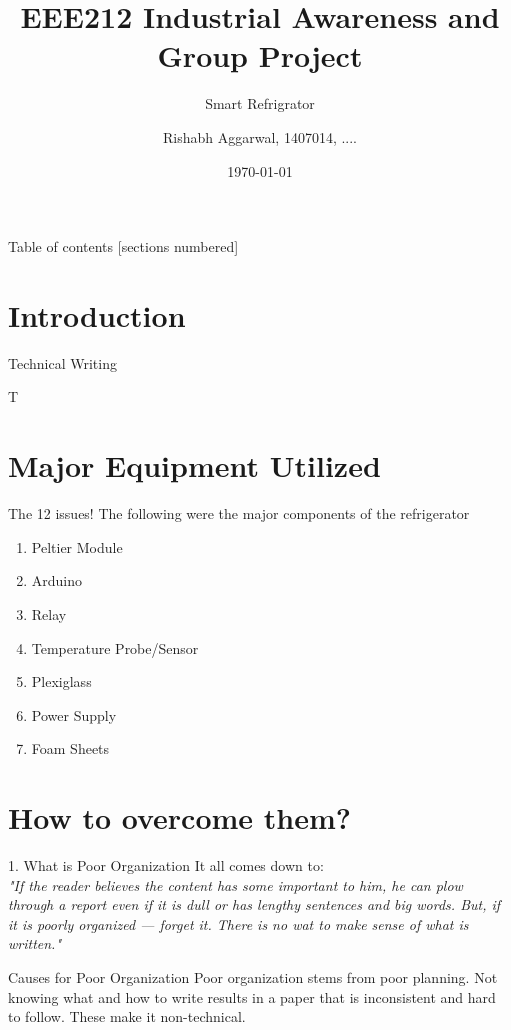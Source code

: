 \documentclass[10pt]{beamer}
\title{EEE212 Industrial Awareness and Group Project}
\subtitle{Smart Refrigrator}
\date{\today}
\author{Rishabh Aggarwal, 1407014, ....}
\institute{Department of Electrical and Electronics Engineering, XJTLU}
\begin{document}
\maketitle
{
\begin{frame}{Table of contents}
  [sections numbered]
  \tableofcontents[hideallsubsections]
\end{frame}
}
\section{Introduction}
{
\begin{frame}[fragile]{Technical Writing}

  T
  
\end{frame}
}

\section{Major Equipment Utilized}
{
\begin{frame}{The 12 issues!}
	The following were the major components of the refrigerator
	\begin{enumerate}[<+- | alert@+>]
		\item Peltier Module
		\item Arduino
		\item Relay
		\item Temperature Probe/Sensor
		\item Plexiglass
		\item Power Supply
		\item Foam Sheets
	\end{enumerate}
\end{frame}
}
\section{How to overcome them?}
{
\begin{frame}{1. What is Poor Organization}
	It all comes down to:\\
	\textit{"If the reader believes the content has some important to him, he can plow through a report even if it is dull or has lengthy sentences and big words. But, if it is poorly organized --- forget it. There is no wat to make sense of what is written."}
\end{frame}
}

{
	\begin{frame}{Causes for Poor Organization}
		Poor organization stems from poor planning. Not knowing what and how to write results in a paper that is inconsistent and hard to follow. These make it non-technical. 
	\end{frame}
}
\end{document}
